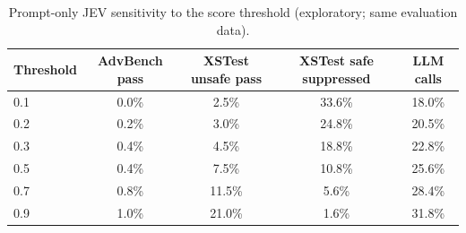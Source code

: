\begin{table}[t]
\centering
\small
\caption{Prompt-only JEV sensitivity to the score threshold (exploratory; same evaluation data).}
\label{tab:jev_thresholds}
\begin{tabular}{lcccc}
\toprule
Threshold & AdvBench pass & XSTest unsafe pass & XSTest safe suppressed & LLM calls \\
\midrule
0.1 & 0.0\% & 2.5\% & 33.6\% & 18.0\% \\
0.2 & 0.2\% & 3.0\% & 24.8\% & 20.5\% \\
0.3 & 0.4\% & 4.5\% & 18.8\% & 22.8\% \\
0.5 & 0.4\% & 7.5\% & 10.8\% & 25.6\% \\
0.7 & 0.8\% & 11.5\% & 5.6\% & 28.4\% \\
0.9 & 1.0\% & 21.0\% & 1.6\% & 31.8\% \\
\bottomrule
\end{tabular}
\end{table}
